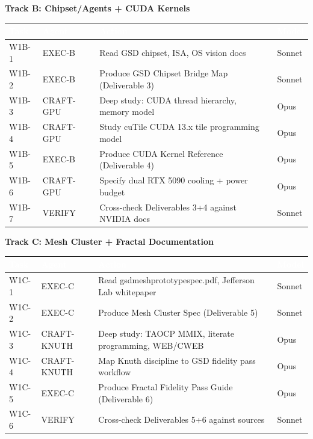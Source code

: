 \documentclass[11pt,letterpaper]{article}
\newcommand{\tableheader}[1]{\textbf{\sffamily\textcolor{white}{#1}}}
\begin{document}
\textbf{Track B: Chipset/Agents + CUDA Kernels}

\begin{center}
\begin{tabularx}{\textwidth}{L{2cm}L{3cm}XL{2cm}}
\toprule
{}
\tableheader{Task} & \tableheader{Agent} & \tableheader{Action} & \tableheader{Model} \\
\midrule
W1B-1 & EXEC-B & Read GSD chipset, ISA, OS vision docs & Sonnet \\
W1B-2 & EXEC-B & Produce GSD Chipset Bridge Map (Deliverable 3) & Sonnet \\
W1B-3 & CRAFT-GPU & Deep study: CUDA thread hierarchy, memory model & Opus \\
W1B-4 & CRAFT-GPU & Study cuTile CUDA 13.x tile programming model & Opus \\
W1B-5 & EXEC-B & Produce CUDA Kernel Reference (Deliverable 4) & Opus \\
W1B-6 & CRAFT-GPU & Specify dual RTX 5090 cooling + power budget & Opus \\
W1B-7 & VERIFY & Cross-check Deliverables 3+4 against NVIDIA docs & Sonnet \\
\bottomrule
\end{tabularx}
\end{center}

\textbf{Track C: Mesh Cluster + Fractal Documentation}

\begin{center}
\begin{tabularx}{\textwidth}{L{2cm}L{3cm}XL{2cm}}
\toprule
{}
\tableheader{Task} & \tableheader{Agent} & \tableheader{Action} & \tableheader{Model} \\
\midrule
W1C-1 & EXEC-C & Read gsdmeshprototypespec.pdf, Jefferson Lab whitepaper & Sonnet \\
W1C-2 & EXEC-C & Produce Mesh Cluster Spec (Deliverable 5) & Sonnet \\
W1C-3 & CRAFT-KNUTH & Deep study: TAOCP MMIX, literate programming, WEB/CWEB & Opus \\
W1C-4 & CRAFT-KNUTH & Map Knuth discipline to GSD fidelity pass workflow & Opus \\
W1C-5 & EXEC-C & Produce Fractal Fidelity Pass Guide (Deliverable 6) & Opus \\
W1C-6 & VERIFY & Cross-check Deliverables 5+6 against sources & Sonnet \\
\bottomrule
\end{tabularx}
\end{center}
\end{document}
